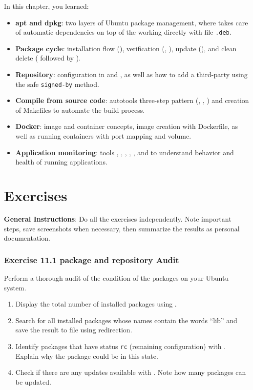 In this chapter, you learned:

\begin{itemize}[noitemsep,topsep=2pt]
\item \textbf{apt and dpkg}: two layers of Ubuntu package management, where
 takes care of automatic dependencies on top of the working 
directly with file \texttt{.deb}.
\item \textbf{Package cycle}: installation flow (), verification
(, ), update (), and clean delete ( followed by ).
\item \textbf{Repository}: configuration in  and
, as well as how to add a third-party 
using the safe \texttt{signed-by} method.
\item \textbf{Compile from source code}: autotools three-step pattern
(, , ) and creation of Makefiles to automate the build process.
\item \textbf{Docker}: image and container concepts, image creation with
Dockerfile, as well as running containers with port mapping and volume.
\item \textbf{Application monitoring}: tools , , ,
, , and  to understand behavior and
health of running applications.
\end{itemize}

\section{Exercises}
\label{sec:application-exercises}

\textbf{General Instructions}: Do all the exercises independently. Note important steps, save screenshots when necessary, then summarize the results as personal documentation.

\subsubsection*{Exercise 11.1 package and repository Audit}
Perform a thorough audit of the condition of the packages on your Ubuntu system.
\begin{enumerate}
\item Display the total number of installed packages using .
\item Search for all installed packages whose names contain the words ``lib'' and
save the result to file  using redirection.
\item Identify packages that have status \texttt{rc} (remaining configuration)
with . Explain why the package could be in this state.
\item Check if there are any updates available with . Note how many packages can be updated.
\end{enumerate}

